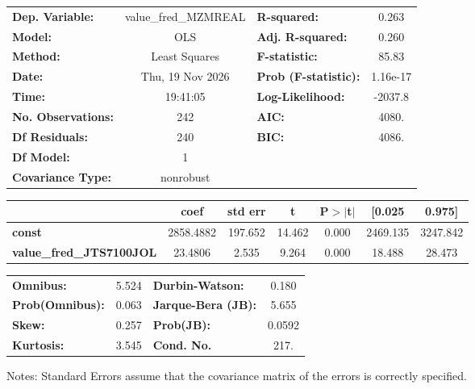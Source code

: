 \begin{center}
\begin{tabular}{lclc}
\toprule
\textbf{Dep. Variable:}          & value\_fred\_MZMREAL & \textbf{  R-squared:         } &     0.263   \\
\textbf{Model:}                  &         OLS          & \textbf{  Adj. R-squared:    } &     0.260   \\
\textbf{Method:}                 &    Least Squares     & \textbf{  F-statistic:       } &     85.83   \\
\textbf{Date:}                   &   Thu, 19 Nov 2026   & \textbf{  Prob (F-statistic):} &  1.16e-17   \\
\textbf{Time:}                   &       19:41:05       & \textbf{  Log-Likelihood:    } &   -2037.8   \\
\textbf{No. Observations:}       &           242        & \textbf{  AIC:               } &     4080.   \\
\textbf{Df Residuals:}           &           240        & \textbf{  BIC:               } &     4086.   \\
\textbf{Df Model:}               &             1        & \textbf{                     } &             \\
\textbf{Covariance Type:}        &      nonrobust       & \textbf{                     } &             \\
\bottomrule
\end{tabular}
\begin{tabular}{lcccccc}
                                 & \textbf{coef} & \textbf{std err} & \textbf{t} & \textbf{P$> |$t$|$} & \textbf{[0.025} & \textbf{0.975]}  \\
\midrule
\textbf{const}                   &    2858.4882  &      197.652     &    14.462  &         0.000        &     2469.135    &     3247.842     \\
\textbf{value\_fred\_JTS7100JOL} &      23.4806  &        2.535     &     9.264  &         0.000        &       18.488    &       28.473     \\
\bottomrule
\end{tabular}
\begin{tabular}{lclc}
\textbf{Omnibus:}       &  5.524 & \textbf{  Durbin-Watson:     } &    0.180  \\
\textbf{Prob(Omnibus):} &  0.063 & \textbf{  Jarque-Bera (JB):  } &    5.655  \\
\textbf{Skew:}          &  0.257 & \textbf{  Prob(JB):          } &   0.0592  \\
\textbf{Kurtosis:}      &  3.545 & \textbf{  Cond. No.          } &     217.  \\
\bottomrule
\end{tabular}
\end{center}

Notes: \newline
 [1] Standard Errors assume that the covariance matrix of the errors is correctly specified.